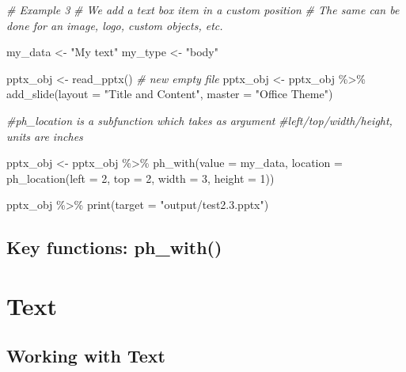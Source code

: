 \documentclass[
]{book}
\newenvironment{Shaded}{\begin{snugshade}}{\end{snugshade}}
\newcommand{\AttributeTok}[1]{\textcolor[rgb]{0.77,0.63,0.00}{#1}}
\newcommand{\CommentTok}[1]{\textcolor[rgb]{0.56,0.35,0.01}{\textit{#1}}}
\newcommand{\DecValTok}[1]{\textcolor[rgb]{0.00,0.00,0.81}{#1}}
\newcommand{\FunctionTok}[1]{\textcolor[rgb]{0.00,0.00,0.00}{#1}}
\newcommand{\NormalTok}[1]{#1}
\newcommand{\OtherTok}[1]{\textcolor[rgb]{0.56,0.35,0.01}{#1}}
\newcommand{\SpecialCharTok}[1]{\textcolor[rgb]{0.00,0.00,0.00}{#1}}
\newcommand{\StringTok}[1]{\textcolor[rgb]{0.31,0.60,0.02}{#1}}
\begin{document}
\begin{Shaded}
\begin{Highlighting}[]
\CommentTok{\# Example 3}
\CommentTok{\# We add a text box item in a custom position}
\CommentTok{\# The same can be done for an image, logo, custom objects, etc.}

\NormalTok{my\_data }\OtherTok{\textless{}{-}} \StringTok{"My text"}
\NormalTok{my\_type }\OtherTok{\textless{}{-}} \StringTok{"body"}

\NormalTok{pptx\_obj }\OtherTok{\textless{}{-}} \FunctionTok{read\_pptx}\NormalTok{() }\CommentTok{\# new empty file}
\NormalTok{pptx\_obj }\OtherTok{\textless{}{-}}\NormalTok{ pptx\_obj }\SpecialCharTok{\%\textgreater{}\%}
  \FunctionTok{add\_slide}\NormalTok{(}\AttributeTok{layout =} \StringTok{"Title and Content"}\NormalTok{, }\AttributeTok{master =} \StringTok{"Office Theme"}\NormalTok{)}

\CommentTok{\#ph\_location is a subfunction which takes as argument }
\CommentTok{\#left/top/width/height, units are inches}

\NormalTok{pptx\_obj }\OtherTok{\textless{}{-}}\NormalTok{ pptx\_obj }\SpecialCharTok{\%\textgreater{}\%}
  \FunctionTok{ph\_with}\NormalTok{(}\AttributeTok{value =}\NormalTok{ my\_data, }\AttributeTok{location =} \FunctionTok{ph\_location}\NormalTok{(}\AttributeTok{left =} \DecValTok{2}\NormalTok{, }\AttributeTok{top =} \DecValTok{2}\NormalTok{, }\AttributeTok{width =} \DecValTok{3}\NormalTok{, }\AttributeTok{height =} \DecValTok{1}\NormalTok{))}

\NormalTok{pptx\_obj }\SpecialCharTok{\%\textgreater{}\%}
  \FunctionTok{print}\NormalTok{(}\AttributeTok{target =} \StringTok{"output/test2.3.pptx"}\NormalTok{) }
\end{Highlighting}
\end{Shaded}

\hypertarget{key-functions-ph_with}{%
\subsection{Key functions: ph\_with()}\label{key-functions-ph_with}}

\hypertarget{text}{%
\section{Text}\label{text}}

\hypertarget{working-with-text}{%
\subsection{Working with Text}\label{working-with-text}}
\end{document}
